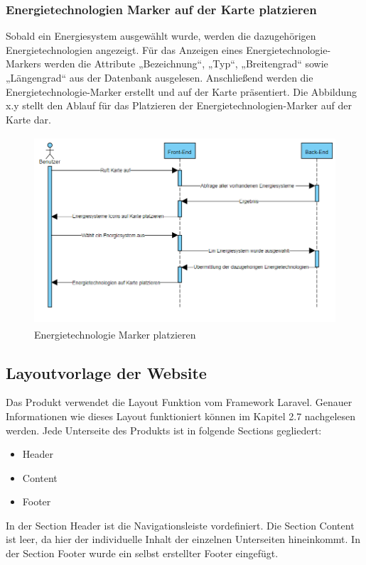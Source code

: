 \newpage
\subsubsection{Energietechnologien Marker auf der Karte platzieren}
Sobald ein Energiesystem ausgewählt wurde, werden die dazugehörigen Energietechnologien angezeigt. Für das Anzeigen eines Energietechnologie-Markers werden die Attribute „Bezeichnung“, „Typ“, „Breitengrad“ sowie „Längengrad“ aus der Datenbank ausgelesen. Anschließend werden die Energietechnologie-Marker erstellt und auf der Karte präsentiert. Die Abbildung x.y stellt den Ablauf für das Platzieren der Energietechnologien-Marker auf der Karte dar.
\newline
\begin{figure}[h]
	\centering
	\includegraphics[height=7cm,width=14cm]{images/SetETMarker}
	\caption{Energietechnologie Marker platzieren}
	\label{fig:Energiesystem auswählen }
\end{figure}


\subsection{Layoutvorlage der Website}
Das Produkt verwendet die Layout Funktion vom Framework Laravel. Genauer Informationen wie dieses Layout funktioniert können im Kapitel 2.7 nachgelesen werden. Jede Unterseite des Produkts ist in folgende Sections gegliedert:
\begin{itemize}
	\item Header  
	\item Content
	\item Footer  
\end{itemize}

In der Section Header ist die Navigationsleiste vordefiniert. Die Section Content ist leer, da hier der individuelle Inhalt der einzelnen Unterseiten hineinkommt. In der Section Footer wurde ein selbst erstellter Footer eingefügt.



